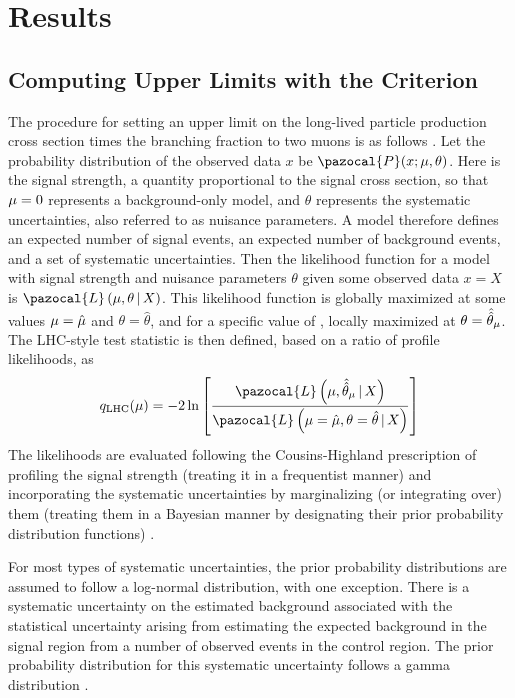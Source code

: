 \section{Results}
\subsection{Computing Upper Limits with the \CLs Criterion}
\label{sec:dd:cls}
The procedure for setting an upper limit on the long-lived particle production cross section times the branching fraction to two muons is as follows \cite{CMS-NOTE-2011-005}.
Let the probability distribution of the observed data $x$ be $\pazocal{P}(x; \sigstr, \theta)$.
Here \sigstr is the signal strength, a quantity proportional to the signal cross section, so that $\mu = 0$ represents a background-only model, and $\theta$ represents the systematic uncertainties, also referred to as nuisance parameters.
A model therefore defines an expected number of signal events, an expected number of background events, and a set of systematic uncertainties.
Then the likelihood function for a model with signal strength \sigstr and nuisance parameters $\theta$ given some observed data $x = X$ is $\pazocal{L}\left(\sigstr, \theta \,\vert\, X\right)$.
This likelihood function is globally maximized at some values $\mu = \hat{\mu}$ and $\theta = \hat{\theta}$, and for a specific value of \sigstr, locally maximized at $\theta = \hat{\hat{\theta}}_\mu$.
The LHC-style test statistic \cite{CombineManual} is then defined, based on a ratio of profile likelihoods, as
\begin{equation}
  q_\text{LHC}(\sigstr) = -2\ln\left[\frac{\pazocal{L}\left(\sigstr, \hat{\hat{\theta}}_\sigstr \,\vert\, X\right)}{\pazocal{L}\left(\sigstr = \hat{\sigstr}, \theta=\hat{\theta}\,\vert\,  X\right)}\right]
  \label{eq:dd:qLHC}
\end{equation}
The likelihoods are evaluated following the Cousins-Highland prescription of profiling the signal strength (treating it in a frequentist manner) and incorporating the systematic uncertainties by marginalizing (or integrating over) them (treating them in a Bayesian manner by designating their prior probability distribution functions) \cite{CousinsHighland:SystUnc1992}.

For most types of systematic uncertainties, the prior probability distributions are assumed to follow a log-normal distribution, with one exception.
There is a systematic uncertainty on the estimated background associated with the statistical uncertainty arising from estimating the expected background in the signal region from a number of observed events in the control region.
The prior probability distribution for this systematic uncertainty follows a gamma distribution \cite{Cousins:ZBi2008, Cousins:LogNormal}.

